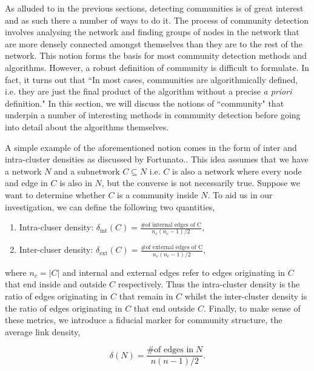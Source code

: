 As alluded to in the previous sections, detecting communities is of great interest and as such there a number of ways to do it. The process of community detection involves analysing the network and finding groups of nodes in the network that are more densely connected amongst themselves than they are to the rest of the network. This notion forms the basis for most community detection methods and algorithms. However, a robust definition of community is difficult to formulate. In fact, it turns out that ``In most cases, communities are algorithmically defined, i.e. they are just the final product of the algorithm without a precise \emph{a priori} definition."\cite[84]{fortunato} In this section, we will discuss the notions of ``community" that underpin a number of interesting methods in community detection before going into detail about the algorithms themselves.

A simple example of the aforementioned notion comes in the form of inter and intra-cluster densities as discussed by Fortunato.\cite[84]{fortunato}. This idea assumes that we have a network $N$ and a subnetwork $C \subseteq N$ i.e. $C$ is also a network where every node and edge in $C$ is also in $N$, but the converse is not necessarily true. Suppose we want to determine whether $C$ is a community inside $N$. To aid us in our investigation, we can define the following two quantities,

\begin{enumerate}
    \item Intra-cluser density: $\delta_{\text{int}}(C) = \frac{\text{\# of internal edges of C}}{n_c(n_c - 1)/2} $,
    \item Inter-cluser density: $\delta_{\text{ext}}(C) = \frac{\text{\# of external edges of C}}{n_c(n_c - 1)/2} $,
\end{enumerate}

where $n_c = |C|$ and internal and external edges refer to edges originating in $C$ that end inside and outside $C$ respectively. Thus the intra-cluster density is the ratio of edges originating in $C$ that remain in $C$ whilst the inter-cluster density is the ratio of edges originating in $C$ that end outside $C$. Finally, to make sense of these metrics, we introduce a fiducial marker for community structure, the average link density,

$$ \delta(N) = \frac{\text{\# of edges in}\; N}{n(n-1)/2}. $$

